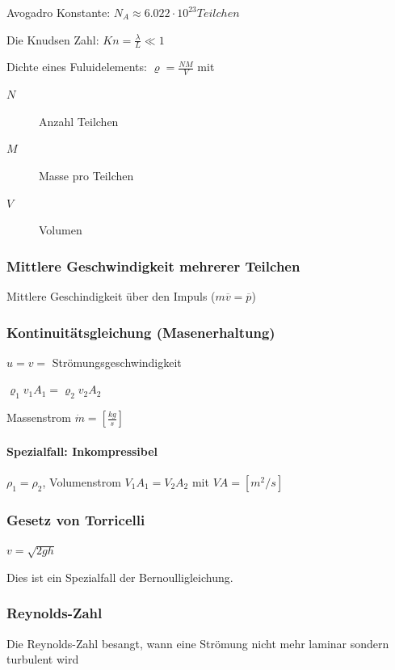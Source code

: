 \documentclass[a4paper]{scrartcl}
\begin{document}
Avogadro Konstante: $N_A \approx 6.022 \cdot 10^23 Teilchen$

Die Knudsen Zahl: $Kn = \frac{\lambda}{L} \ll 1$

Dichte eines Fuluidelements: $\varrho = \frac{NM}{V}$ mit
\begin{description}
	\item[$N$] Anzahl Teilchen
	\item[$M$] Masse pro Teilchen 
	\item[$V$] Volumen
\end{description}

\subsubsection{Mittlere Geschwindigkeit mehrerer Teilchen}

Mittlere Geschindigkeit über den Impuls ($m\overline{v} = \overline{p}$)


\subsubsection{Kontinuitätsgleichung (Masenerhaltung)}


$u = v = $ Strömungsgeschwindigkeit 

$\varrho_1 v_1 A_1 = \varrho_2 v_2 A_2$

Massenstrom $\dot{m} = \left[ \frac{kg}{s} \right]$

\paragraph{Spezialfall: Inkompressibel} $\rho_1 = \rho_2$, Volumenstrom $V_1 A_1 = V_2 A_2$ mit $VA = \left[ m^2/s \right]$


\subsubsection{Gesetz von Torricelli}

$v = \sqrt{2gh}$

Dies ist ein Spezialfall der Bernoulligleichung.

\subsubsection{Reynolds-Zahl}

Die Reynolds-Zahl besangt, wann eine Strömung nicht mehr laminar sondern turbulent wird
\end{document}

